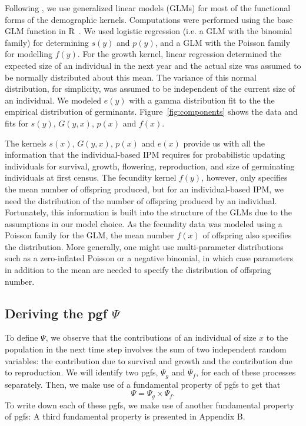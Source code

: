 \documentclass[12pt]{amsart}\usepackage[]{graphicx}\usepackage[]{color}
\begin{document}
Following \citet{salguero-etal-12}, we use generalized linear models (GLMs) for most of the functional forms of the demographic kernels. Computations were performed using the base GLM function in R~\citep{R-15}. We used logistic regression (i.e. a GLM with the binomial family) for determining $s(y)$ and $p(y)$, and a GLM with the Poisson family for modelling $f(y)$.  For the growth kernel, linear regression determined the expected size of an individual in the next year and the actual size was assumed to be normally distributed about this mean. The variance of this normal distribution, for simplicity, was assumed to be independent of the current size of an individual. We modeled $e(y)$ with a gamma distribution fit to the the empirical distribution of germinants. Figure~\ref{fig:components} shows the data and fits for $s(y)$, $G(y, x)$, $p(x)$ and $f(x)$.

The kernels $s(x)$, $G(y, x)$, $p(x)$ and $e(x)$ provide us with all the information that the individual-based IPM requires for probabilistic updating individuals for survival, growth, flowering, reproduction, and size of germinating individuals at first census. The fecundity kernel $f(y)$, however, only specifies the mean number of offspring produced, but for an individual-based IPM, we need the distribution of the number of offspring produced by an individual. Fortunately, this information is built into the structure of the GLMs due to the assumptions in our model choice. As the fecundity data was modeled using a Poisson family for the GLM, the mean number $f(x)$ of offspring also specifies the distribution. More generally, one might use multi-parameter distributions such as a zero-inflated Poisson or a negative binomial, in which case parameters in addition to the mean are needed to specify the distribution of offspring number.

\subsection*{Deriving the pgf $\Psi$}

To define $\Psi$, we observe that the contributions of an individual of size $x$ to the population in the next time step involves the sum of two independent random variables:  the contribution due to survival and growth and the contribution due to reproduction. We will identify two pgfs, $\Psi_g$ and $\Psi_f$, for each of these processes separately. Then, we make use of a fundamental property of pgfs\vskip 0.1in
\vskip 0.1in\noindent
to get that
\[
\Psi=\Psi_g \times \Psi_f.
\]
To write down each of these pgfs, we make use of another fundamental property of pgfs:
\vskip 0.1in
\vskip 0.1in
A third fundamental property is presented in Appendix B. 
\end{document}
